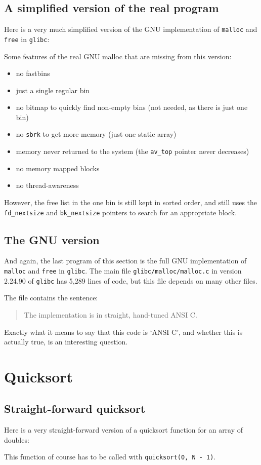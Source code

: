 \documentclass{article}
\begin{document}
\subsection{A simplified version of the real program}
Here is a very much simplified version of the GNU implementation of \texttt{malloc} and \texttt{free} in \texttt{glibc}:

Some features of the real GNU malloc that are missing from this version:
\begin{itemize}
\item no fastbins
\item just a single regular bin
\item no bitmap to quickly find non-empty bins (not needed, as there is just one bin)
\item no \texttt{sbrk} to get more memory (just one static array)
\item memory never returned to the system (the \lstinline|av_top| pointer never decreases)
\item no memory mapped blocks
\item no thread-awareness
\end{itemize}
However, the free list in the one bin is still kept in sorted order, and still uses
the \lstinline|fd_nextsize| and \lstinline|bk_nextsize| pointers to search
for an appropriate block.

\subsection{The GNU version}
And again, the last program of this section is the full GNU implementation of \texttt{malloc} and \texttt{free} in \texttt{glibc}.
The main file \lstinline|glibc/malloc/malloc.c| in version 2.24.90 of \texttt{glibc} has 5,289 lines of code, but this file depends on many other files.

The file contains the sentence:
\begin{quote}
The implementation is in straight, hand-tuned ANSI C.
\end{quote}
Exactly what it means to say that this code is `ANSI C', and whether this is actually true, is an interesting question.
\addtocounter{lstlisting}{1}

\section{Quicksort}
\subsection{Straight-forward quicksort}\label{qsort1}
Here is a very straight-forward version of a quicksort function for
an array of doubles:

This function of course has to be called with \lstinline|quicksort(0, N - 1)|.
\end{document}
